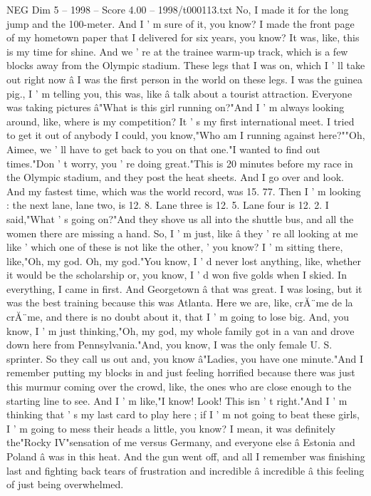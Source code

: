 \begin{textsample}{NEG Dim 5 – 1998 – Score 4.00 – 1998/t000113.txt}
No, I made it for the long jump and the 100-meter.
And I ' m sure of it, you know?
I made the front page of my hometown paper that I delivered for six years, you know?
It was, like, this is my time for shine.
And we ' re at the trainee warm-up track, which is a few blocks away from the Olympic stadium.
These legs that I was on, which I ' ll take out right now â I was the first person in the world on these legs.
I was the guinea pig., I ' m telling you, this was, like â talk about a tourist attraction.
Everyone was taking pictures â"What is this girl running on?"And I ' m always looking around, like, where is my competition?
It ' s my first international meet.
I tried to get it out of anybody I could, you know,"Who am I running against here?""Oh, Aimee, we ' ll have to get back to you on that one."I wanted to find out times."Don ' t worry, you ' re doing great."This is 20 minutes before my race in the Olympic stadium, and they post the heat sheets.
And I go over and look.
And my fastest time, which was the world record, was 15. 77.
Then I ' m looking : the next lane, lane two, is 12. 8.
Lane three is 12. 5.
Lane four is 12. 2.
I said,"What ' s going on?"And they shove us all into the shuttle bus, and all the women there are missing a hand.
So, I ' m just, like â they ' re all looking at me like ' which one of these is not like the other, ' you know?
I ' m sitting there, like,"Oh, my god.
Oh, my god."You know, I ' d never lost anything, like, whether it would be the scholarship or, you know, I ' d won five golds when I skied.
In everything, I came in first.
And Georgetown â that was great.
I was losing, but it was the best training because this was Atlanta.
Here we are, like, crĂ¨me de la crĂ¨me, and there is no doubt about it, that I ' m going to lose big.
And, you know, I ' m just thinking,"Oh, my god, my whole family got in a van and drove down here from Pennsylvania."And, you know, I was the only female U.
S. sprinter.
So they call us out and, you know â"Ladies, you have one minute."And I remember putting my blocks in and just feeling horrified because there was just this murmur coming over the crowd, like, the ones who are close enough to the starting line to see.
And I ' m like,"I know!
Look!
This isn ' t right."And I ' m thinking that ' s my last card to play here ; if I ' m not going to beat these girls, I ' m going to mess their heads a little, you know?
I mean, it was definitely the"Rocky IV"sensation of me versus Germany, and everyone else â Estonia and Poland â was in this heat.
And the gun went off, and all I remember was finishing last and fighting back tears of frustration and incredible â incredible â this feeling of just being overwhelmed.

\end{textsample}
